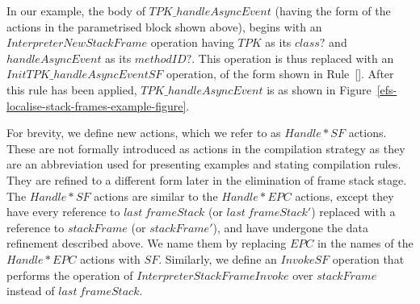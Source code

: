 In our example, the body of $TPK\_handleAsyncEvent$ (having the form
of the actions in the parametrised block shown above), begins with an
$InterpreterNewStackFrame$ operation having $TPK$ as its $class?$ and
$handleAsyncEvent$ as its $methodID?$.
This operation is thus replaced with an $InitTPK\_handleAsyncEventSF$
operation, of the form shown in
Rule~[].
After this rule has been applied, $TPK\_handleAsyncEvent$ is as shown
in Figure~\ref{efs-localise-stack-frames-example-figure}.

For brevity, we define new actions, which we refer to as $Handle{*}SF$
actions.
These are not formally introduced as actions in the compilation
strategy as they are an abbreviation used for presenting examples and
stating compilation rules.
They are refined to a different form later in the elimination of frame
stack stage.
The $Handle{*}SF$ actions are similar to the $Handle{*}EPC$ actions,
except they have every reference to $last~frameStack$ (or
$last~frameStack'$) replaced with a reference to $stackFrame$ (or
$stackFrame'$), and have undergone the data refinement described
above.
We name them by replacing $EPC$ in the names of the $Handle{*}EPC$
actions with $SF$.
Similarly, we define an $InvokeSF$ operation that performs the
operation of $InterpreterStackFrameInvoke$ over $stackFrame$ instead
of $last~frameStack$.

